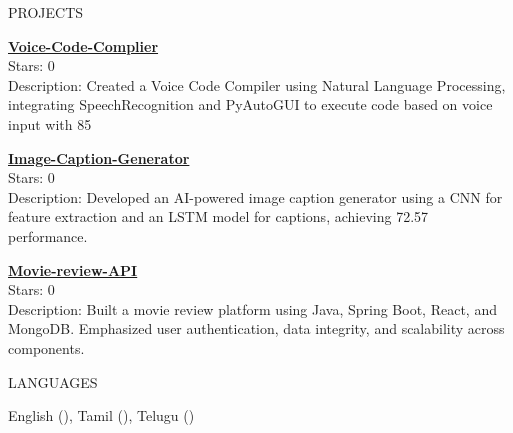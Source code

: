 \documentclass{resume}
\begin{document}
\begin{rSection}{PROJECTS}    
    \item \textbf{\href{https://github.com/AksayaVenugopal/Voice-Code-Complier}{Voice-Code-Complier}}\\
Stars: 0\\
Description: Created a Voice Code Compiler using Natural Language Processing, integrating SpeechRecognition and PyAutoGUI to execute code based on voice input with 85%
\\
\item \textbf{\href{https://github.com/AksayaVenugopal/Image-Caption-Generator}{Image-Caption-Generator}}\\
Stars: 0\\
Description:  Developed an AI-powered image caption generator using a CNN for feature extraction and an LSTM model for
captions, achieving 72.57%
performance.
\\
\item \textbf{\href{https://github.com/AksayaVenugopal/Movie-review-API}{Movie-review-API}}\\
Stars: 0\\
Description:  Built a movie review platform using Java, Spring Boot, React, and MongoDB. Emphasized user authentication, data
integrity, and scalability across components.
\\

\end{rSection}
\vspace{1.5em}


\begin{rSection}{LANGUAGES}

\begin{itemize}
    English (), Tamil (), Telugu ()
\end{itemize}

\end{rSection}



\end{document}
